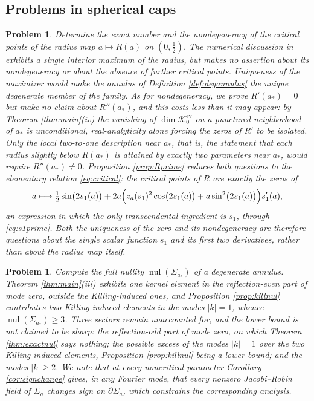 \documentclass[10pt,a4paper]{amsart}
\newtheorem{problem}[theorem]{Problem}
\newcommand{\nul}{\operatorname{nul}}
\newcommand{\Ker}{\mathcal{K}}
\begin{document}
\subsection*{Problems in spherical caps}

\begin{problem}\label{prob:caps}
Determine the exact number and the nondegeneracy of the critical points of the radius map $a\mapsto R(a)$ on $(0,\tfrac12)$. The numerical discussion in \cite[Rem. 1.3]{NZ1} exhibits a single interior maximum of the radius, but makes no assertion about its nondegeneracy or about the absence of further critical points. Uniqueness of the maximizer would make the annulus of Definition \ref{def:degannulus} the unique degenerate member of the family. As for nondegeneracy, we prove $R'(a_*)=0$ but make no claim about $R''(a_*)$, and this costs less than it may appear: by Theorem \ref{thm:main}(iv) the vanishing of $\dim\Ker_0^{\mathrm{ev}}$ on a punctured neighborhood of $a_*$ is unconditional, real-analyticity alone forcing the zeros of $R'$ to be isolated. Only the local two-to-one description near $a_*$, that is, the statement that each radius slightly below $R(a_*)$ is attained by exactly two parameters near $a_*$, would require $R''(a_*)\neq 0$. Proposition \ref{prop:Rprime} reduces both questions to the elementary relation \eqref{eq:critical}: the critical points of $R$ are exactly the zeros of
\[
a\longmapsto \tfrac12\sin\bigl(2s_1(a)\bigr)+2a\Bigl(z_a(s_1)^2\cos\bigl(2s_1(a)\bigr)+a\sin^2\bigl(2s_1(a)\bigr)\Bigr)s_1'(a),
\]
an expression in which the only transcendental ingredient is $s_1$, through \eqref{eq:s1prime}. Both the uniqueness of the zero and its nondegeneracy are therefore questions about the single scalar function $s_1$ and its first two derivatives, rather than about the radius map itself.
\end{problem}

\begin{problem}\label{prob:fullnullity}
Compute the full nullity $\nul(\Sigma_{a_*})$ of a degenerate annulus. Theorem \ref{thm:main}(iii) exhibits one kernel element in the reflection-even part of mode zero, outside the Killing-induced ones, and Proposition \ref{prop:killnul} contributes two Killing-induced elements in the modes $|k|=1$, whence $\nul(\Sigma_{a_*})\geq 3$. Three sectors remain unaccounted for, and the lower bound is not claimed to be sharp: the reflection-odd part of mode zero, on which Theorem \ref{thm:exactnul} says nothing; the possible excess of the modes $|k|=1$ over the two Killing-induced elements, Proposition \ref{prop:killnul} being a lower bound; and the modes $|k|\geq 2$. We note that at every \emph{noncritical} parameter Corollary \ref{cor:signchange} gives, in any Fourier mode, that every nonzero Jacobi--Robin field of $\Sigma_a$ changes sign on $\partial\Sigma_a$, which constrains the corresponding analysis.
\end{problem}
\end{document}
